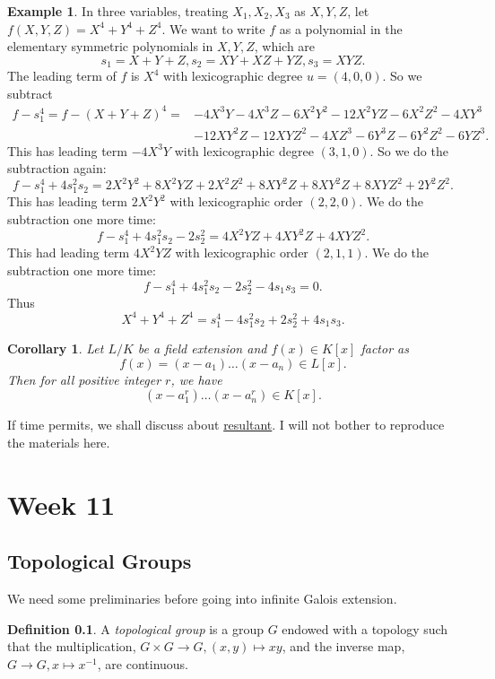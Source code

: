 \documentclass[12pt]{report}
\newtheorem{corollary}[theorem]{Corollary}
\theoremstyle{definition}
\newtheorem{definition}[theorem]{Definition}
\newtheorem{example}[theorem]{Example}
\begin{document}
\begin{example}
	In three variables, treating $X_1,X_2,X_3$ as $X,Y,Z$, let $f(X,Y,Z)=X^4+Y^4+Z^4$. We want to write $f$ as a polynomial  in the elementary symmetric polynomials in $X,Y, Z$, which are $$s_1=X+Y+Z, s_2=XY+XZ+YZ, s_3=XYZ.$$
	The leading term of $f$ is $X^4$ with lexicographic degree $u=(4,0,0)$. So we subtract \begin{align*}
		f-s_1^4= f-(X+Y+Z)^4 = & -4X^3Y-4X^3Z-6X^2Y^2-12X^2YZ-6X^2Z^2-4XY^3   \\
		                       & -12XY^2Z -12XYZ^2-4XZ^3-6Y^3Z-6Y^2Z^2-6YZ^3.
	\end{align*}
	This has leading term $-4X^3Y$ with lexicographic degree $(3,1,0)$. So we do the subtraction again: $$f-s_1^4+4s_1^2s_2=2X^2Y^2+8X^2YZ+2X^2Z^2+8XY^2Z+8XY^2Z+8XYZ^2+2Y^2Z^2.$$
	This has leading term $2X^2Y^2$ with lexicographic order $(2,2,0)$. We do the subtraction one more time:
	$$f-s_1^4+4s_1^2s_2-2s_2^2=4X^2YZ+4XY^2Z+4XYZ^2.$$
	This had leading term $4X^2YZ$ with lexicographic order $(2,1,1)$.
	We do the subtraction one more time:
	$$f-s_1^4+4s_1^2s_2-2s_2^2-4s_1s_3=0.$$
	Thus $$X^4+Y^4+Z^4=s_1^4-4s_1^2s_2+2s_2^2+4s_1s_3.$$
\end{example}

\begin{corollary}
	Let $L/K$ be a field extension and $f(x)\in K[x]$ factor as
	$$f(x)=(x-a_1)\dots(x-a_n)\in L[x].$$
	Then for all positive integer $r$, we have
	$$(x-a_1^r)\dots(x-a_n^r)\in K[x].$$
\end{corollary}

If time permits, we shall discuss about \hyperlink{http://buzzard.ups.edu/courses/2016spring/projects/woody-resultants-ups-434-2016.pdf}{resultant}. I will not bother to reproduce the materials here.

\chapter*{Week 11}
\setcounter{chapter}{11}

\section{Topological Groups}

We need some preliminaries before going into infinite Galois extension.

\begin{definition}
	A \emph{topological group} is a group $G$ endowed with a topology such that the multiplication, $G\times G\to G,(x,y)\mapsto xy$, and the inverse map, $G\to G, x\mapsto x^{-1}$, are continuous.
\end{definition}
\end{document}
